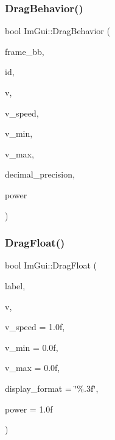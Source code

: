 \hypertarget{namespace_im_gui_a4fdcba60dbe3762a144051add234ea48}{}\label{namespace_im_gui_a4fdcba60dbe3762a144051add234ea48} 
\subsubsection{\texorpdfstring{Drag\+Behavior()}{DragBehavior()}}
{\footnotesize\ttfamily bool Im\+Gui\+::\+Drag\+Behavior (\begin{DoxyParamCaption}\item[{const \hyperlink{struct_im_rect}{Im\+Rect} \&}]{frame\+\_\+bb,  }\item[{Im\+Gui\+ID}]{id,  }\item[{float $\ast$}]{v,  }\item[{float}]{v\+\_\+speed,  }\item[{float}]{v\+\_\+min,  }\item[{float}]{v\+\_\+max,  }\item[{int}]{decimal\+\_\+precision,  }\item[{float}]{power }\end{DoxyParamCaption})}

\hypertarget{namespace_im_gui_ac62335909eaaa63a1ead0226e836baeb}{}\label{namespace_im_gui_ac62335909eaaa63a1ead0226e836baeb} 
\subsubsection{\texorpdfstring{Drag\+Float()}{DragFloat()}}
{\footnotesize\ttfamily bool Im\+Gui\+::\+Drag\+Float (\begin{DoxyParamCaption}\item[{const char $\ast$}]{label,  }\item[{float $\ast$}]{v,  }\item[{float}]{v\+\_\+speed = {\ttfamily 1.0f},  }\item[{float}]{v\+\_\+min = {\ttfamily 0.0f},  }\item[{float}]{v\+\_\+max = {\ttfamily 0.0f},  }\item[{const char $\ast$}]{display\+\_\+format = {\ttfamily \char`\"{}\%.3f\char`\"{}},  }\item[{float}]{power = {\ttfamily 1.0f} }\end{DoxyParamCaption})}

\hypertarget{namespace_im_gui_a2852e4c3b872ed5a5d28047f0290f29c}{}\label{namespace_im_gui_a2852e4c3b872ed5a5d28047f0290f29c} 
